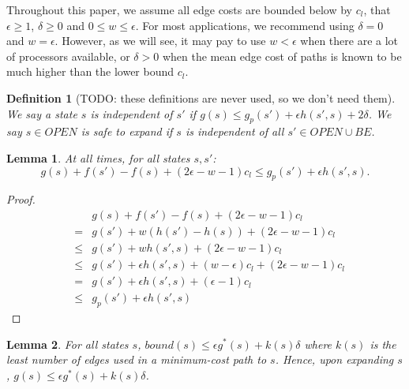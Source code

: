 \documentclass[letterpaper]{article}
\newtheorem{defn}{Definition}
\newtheorem{lemma}{Lemma}
\begin{document}
Throughout this paper, we assume all edge costs are bounded below by $c_l$, that $\epsilon \ge 1$, $\delta \ge 0$ and $0 \le w \le \epsilon$. For most applications, we recommend using $\delta = 0$ and $w = \epsilon$. However, as we will see, it may pay to use $w < \epsilon$ when there are a lot of processors available, or $\delta > 0$ when the mean edge cost of paths is known to be much higher than the lower bound $c_l$.

\begin{defn}[TODO: these definitions are never used, so we don't need them]
We say a state $s$ is independent of $s'$ if $g(s) \le g_p(s') + \epsilon h(s',s) + 2\delta$. We say $s\in OPEN$ is safe to expand if $s$ is independent of all $s'\in OPEN \cup BE$.
\end{defn}

\begin{lemma}
\label{lem:indep}
At all times, for all states $s,s'$:
\[g(s) + f(s') - f(s) + (2\epsilon-w-1) c_l \le g_p(s') + \epsilon h(s',s).\]
\end{lemma}

\begin{proof}
\begin{eqnarray*}
&&g(s) + f(s') - f(s) + (2\epsilon-w-1) c_l
\\&=& g(s') + w(h(s') - h(s)) + (2\epsilon-w-1) c_l
\\&\le& g(s') + wh(s',s) + (2\epsilon-w-1) c_l
\\&\le& g(s') + \epsilon h(s',s) + (w-\epsilon) c_l + (2\epsilon-w-1) c_l
\\&=& g(s') + \epsilon h(s',s) + (\epsilon-1) c_l
\\&\le& g_p(s') + \epsilon h(s',s)
\end{eqnarray*}
\end{proof}

\begin{lemma}
\label{lem:subopt}
For all states $s$, $bound(s) \le \epsilon g^*(s) + k(s)\delta$ where $k(s)$ is the least number of edges used in a minimum-cost path to $s$. Hence, upon expanding $s$, $g(s) \le \epsilon g^*(s) + k(s)\delta$.
\end{lemma}
\end{document}
